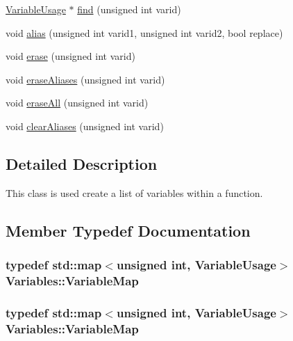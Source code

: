 \begin{DoxyCompactItemize}
\hyperlink{class_variables_1_1_variable_usage}{Variable\-Usage} $\ast$ \hyperlink{class_variables_a400fdc22a2fcc8dcbcea3cfe5c4b8293}{find} (unsigned int varid)
\item 
void \hyperlink{class_variables_a459bf7f3ba16d1b0e127b283579559c7}{alias} (unsigned int varid1, unsigned int varid2, bool replace)
\item 
void \hyperlink{class_variables_abcc083a53b7985ca821258bee9ccec2b}{erase} (unsigned int varid)
\item 
void \hyperlink{class_variables_a51f66c181927366ac8b709fc176db1bb}{erase\-Aliases} (unsigned int varid)
\item 
void \hyperlink{class_variables_a71d64b4a85f0e49934d8af564841eb3c}{erase\-All} (unsigned int varid)
\item 
void \hyperlink{class_variables_a8de7aee44a72fc2a30cb6a79fb76ca68}{clear\-Aliases} (unsigned int varid)
\end{DoxyCompactItemize}


\subsection{Detailed Description}
This class is used create a list of variables within a function. 

\subsection{Member Typedef Documentation}
\hypertarget{class_variables_ad1842b533d8aea619d93eb5d571e35d0}{
\subsubsection[{Variable\-Map}]{\setlength{\rightskip}{0pt plus 5cm}typedef std\-::map$<$unsigned int, {\bf Variable\-Usage}$>$ {\bf Variables\-::\-Variable\-Map}}}\label{class_variables_ad1842b533d8aea619d93eb5d571e35d0}
\hypertarget{class_variables_ad1842b533d8aea619d93eb5d571e35d0}{
\subsubsection[{Variable\-Map}]{\setlength{\rightskip}{0pt plus 5cm}typedef std\-::map$<$unsigned int, {\bf Variable\-Usage}$>$ {\bf Variables\-::\-Variable\-Map}}}\label{class_variables_ad1842b533d8aea619d93eb5d571e35d0}


